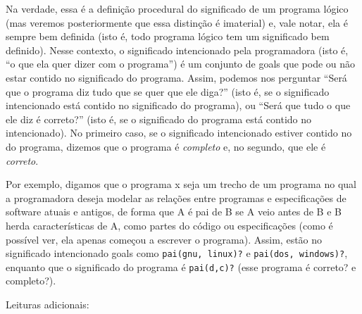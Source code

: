 \documentclass{article}
\theoremstyle{remark}
\begin{document}
  Na verdade, essa é a definição procedural do significado de um programa lógico (mas veremos posteriormente que essa distinção é imaterial) e, vale notar, ela é sempre bem definida (isto é, todo programa lógico tem um significado bem definido). Nesse contexto, o significado intencionado pela programadora (isto é, ``o que ela quer dizer com o programa'') é um conjunto de goals que pode ou não estar contido no significado do programa. Assim, podemos nos perguntar ``Será que o
  programa diz tudo que se quer que ele diga?'' (isto é, se o significado intencionado está contido no significado do programa), ou ``Será que tudo o que ele diz é correto?'' (isto é, se o significado do programa está contido no intencionado). No primeiro caso, se o significado intencionado estiver contido no do programa, dizemos que o programa é \textit{completo} e, no segundo, que ele é \textit{correto}.

  Por exemplo, digamos que o programa x seja um trecho de um programa no qual a programadora deseja modelar as relações entre programas e especificações de software atuais e antigos, de forma que A é pai de B se A veio antes de B e B herda características de A, como partes do código ou especificações (como é possível ver, ela apenas começou a escrever o programa). Assim, estão no significado intencionado goals como {\tt pai(gnu, linux)?} e {\tt pai(dos, windows)?}, enquanto que o
  significado do programa é {\tt pai(d,c)?} (esse programa é correto? e completo?).


  Leituras adicionais:
\end{document}
